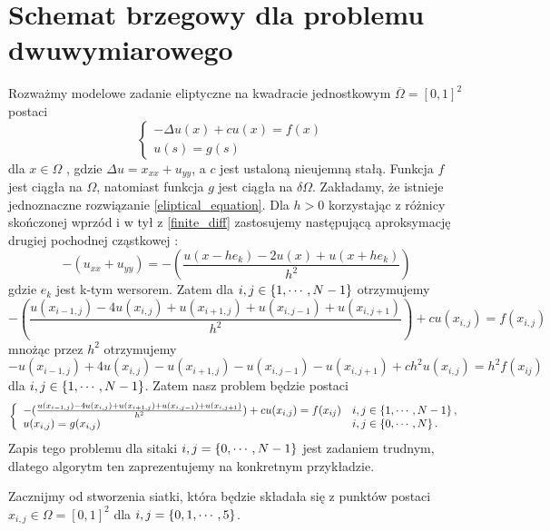 \documentclass[12pt,a4paper]{report}
\begin{document}
\section{Schemat brzegowy dla problemu dwuwymiarowego}
\begin{problem}
Rozważmy modelowe zadanie eliptyczne na kwadracie jednostkowym $ \overline{\Omega} = [0,1]^2 $ postaci 
\begin{equation} \label{eliptical_equation}
\left\{ \begin{array}{ll}
-\Delta u(x) + cu(x) = f(x) & \\
u(s) = g(s) &
\end{array} \right.
\end{equation}
dla $ x \in \Omega $ , gdzie $\Delta u = x_{xx} + u_{yy}$, a $c$ jest ustaloną nieujemną stałą. Funkcja $f$ jest ciągła na $\Omega$, natomiast funkcja $g$ jest ciągła na $\delta \Omega$. Zakładamy, że istnieje jednoznaczne rozwiązanie \ref{eliptical_equation}. Dla $h>0$ korzystając z różnicy skończonej wprzód i w tył z \ref{finite_diff} zastosujemy następującą aproksymację drugiej pochodnej cząstkowej :
\begin{equation}
-(u_{xx} + u_{yy})= -(\frac{u(x-he_{k}) - 2u(x) + u(x+he_k)}{h^2})
\end{equation}
gdzie $e_k$ jest k-tym wersorem. Zatem dla $ i,j \in \left\lbrace {1,\cdots,N-1} \right\rbrace $ otrzymujemy 
$$
-(\frac{u(x_{i-1,j}) - 4u(x_{i,j}) + u(x_{i+1,j})+u(x_{i,j-1})+u(x_{i,j+1})}{h^2}) + cu(x_{i,j}) = f(x_{i,j})
$$
mnożąc przez $h^2$ otrzymujemy 
\begin{equation}\label{schemat_brzeg_II}
-u(x_{i-1,j}) + 4u(x_{i,j}) - u(x_{i+1,j}) - u(x_{i,j-1})- u(x_{i,j+1}) + ch^2u(x_{i,j}) = h^2f(x_{ij})
\end{equation}
dla $i,j \in \left\lbrace {1,\cdots,N-1} \right\rbrace$. Zatem nasz problem będzie postaci
\begin{equation}
\left\{ \begin{array}{ll}
-(\frac{u(x_{i-1,j}) - 4u(x_{i,j}) + u(x_{i+1,j})+u(x_{i,j-1})+u(x_{i,j+1})}{h^2}) + cu(x_{i,j}) = f(x_{ij}) & i,j \in \left\lbrace {1,\cdots, N-1} \right\rbrace ,\\
u(x_{i,j}) = g(x_{i,j})  & i,j \in \left\lbrace {0,\cdots,N} \right\rbrace .
\end{array} \right.
\end{equation}
Zapis tego problemu dla sitaki $i,j = \left\lbrace {0,\cdots,N-1} \right\rbrace $ jest zadaniem trudnym, dlatego algorytm ten zaprezentujemy na konkretnym przykładzie.
\begin{example}
Zacznijmy od stworzenia siatki, która będzie składała się z punktów postaci $x_{i,j} \in \Omega = [0,1]^2$ dla $i,j = \left\lbrace {0,1,\cdots,5} \right\rbrace$.

\end{example}
\end{problem}
\end{document}
